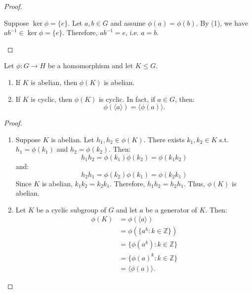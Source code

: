 \begin{itemize}
\begin{proof}
\begin{enumerate}
            Suppose $\ker\phi = \{e\}$. Let $a,b\in G$ and assume $\phi(a)=\phi(b)$. By (1), we have $ab^{-1} \in \ker\phi = \{e\}$. Therefore, $ab^{-1}=e$, i.e. $a=b$.
        \end{enumerate}
    \end{proof}
    \begin{proposition}
        Let $\phi: G\rightarrow H$ be a homomorphism and let $K \le G$.
        \begin{enumerate}
            \item If $K$ is abelian, then $\phi(K)$ is abelian.
            \item If $K$ is cyclic, then $\phi(K)$ is cyclic. In fact, if $a\in G$, then:
            \begin{equation}
                \phi(\langle a\rangle) = \langle \phi(a) \rangle.
            \end{equation}
        \end{enumerate}
    \end{proposition}
    \begin{proof}
        \begin{enumerate}
            \item Suppose $K$ is abelian. Let $h_1,h_2 \in \phi(K)$. There exists $k_1,k_2\in K$ s.t. $h_1 = \phi(k_1)$ and $h_2 = \phi(k_2)$. Then:
            \begin{equation}
                h_1h_2 = \phi(k_1)\phi(k_2)=\phi(k_1k_2)
            \end{equation}
            and:
            \begin{equation}
                h_2h_1=\phi(k_2)\phi(k_1)=\phi(k_2k_1)
            \end{equation}
            Since $K$ is abelian, $k_1k_2 = k_2k_1$. Therefore, $h_1h_2 = h_2h_1$. Thus, $\phi(K)$ is abelian.
            \item Let $K$ be a cyclic subgroup of $G$ and let $a$ be a generator of $K$. Then:
            \begin{align}
                \phi(K) &= \phi(\langle a\rangle) \\ 
                &= \phi(\{a^k : k\in \mathbb{Z}\}) \\ 
                &= \{\phi(a^k): k\in \mathbb{Z}\} \\ 
                &= \{\phi(a)^k: k\in \mathbb{Z}\} \\ 
                &= \langle \phi(a) \rangle.
            \end{align}
        \end{enumerate}

\end{proof}
\end{itemize}
